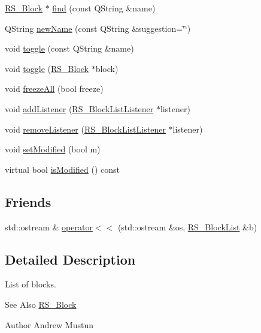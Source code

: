 \begin{DoxyCompactItemize}
\hyperlink{classRS__Block}{R\-S\-\_\-\-Block} $\ast$ \hyperlink{classRS__BlockList_ad2e8328d1d98cab0b3810763d3f29c16}{find} (const Q\-String \&name)
\item 
Q\-String \hyperlink{classRS__BlockList_aab3a125ec6943faf692cfcc440fb59cb}{new\-Name} (const Q\-String \&suggestion=\char`\"{}\char`\"{})
\item 
void \hyperlink{classRS__BlockList_a85052682ac90a22f7b4ddd74cbd8be7a}{toggle} (const Q\-String \&name)
\item 
void \hyperlink{classRS__BlockList_a29abf3cce1cd98d025c3572c9749e099}{toggle} (\hyperlink{classRS__Block}{R\-S\-\_\-\-Block} $\ast$block)
\item 
void \hyperlink{classRS__BlockList_ab118af27d09acd616fb1ff0db46db4f4}{freeze\-All} (bool freeze)
\item 
void \hyperlink{classRS__BlockList_ae0b4c3e327ffbbcee4c3ce7d406bf709}{add\-Listener} (\hyperlink{classRS__BlockListListener}{R\-S\-\_\-\-Block\-List\-Listener} $\ast$listener)
\item 
void \hyperlink{classRS__BlockList_a00d3cd8f78d72bdd84d3d76fee283ee7}{remove\-Listener} (\hyperlink{classRS__BlockListListener}{R\-S\-\_\-\-Block\-List\-Listener} $\ast$listener)
\item 
void \hyperlink{classRS__BlockList_aa1f59a04fba4d2d9f3b2800336bfb0e3}{set\-Modified} (bool m)
\item 
virtual bool \hyperlink{classRS__BlockList_a23a23481e31bf949ff5d4cd786c829d1}{is\-Modified} () const 
\end{DoxyCompactItemize}
\subsection*{Friends}
\begin{DoxyCompactItemize}
\item 
std\-::ostream \& \hyperlink{classRS__BlockList_ad1ee3a80b164ae697cfc805b790ebd5d}{operator$<$$<$} (std\-::ostream \&os, \hyperlink{classRS__BlockList}{R\-S\-\_\-\-Block\-List} \&b)
\end{DoxyCompactItemize}


\subsection{Detailed Description}
List of blocks.

\begin{DoxySeeAlso}{See Also}
\hyperlink{classRS__Block}{R\-S\-\_\-\-Block}
\end{DoxySeeAlso}
\begin{DoxyAuthor}{Author}
Andrew Mustun 
\end{DoxyAuthor}


